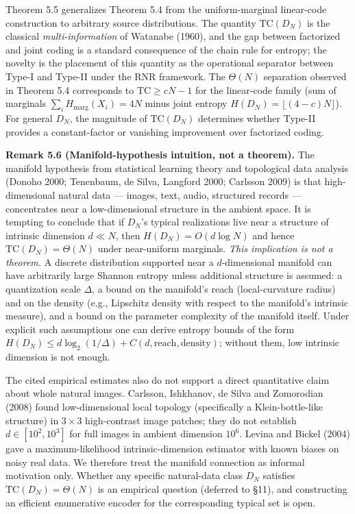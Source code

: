 \documentclass[
]{article}
\begin{document}
Theorem 5.5 generalizes Theorem 5.4 from the uniform-marginal
linear-code construction to arbitrary source distributions. The
quantity $\mathrm{TC}(D_N)$ is the classical \emph{multi-information}
of Watanabe (1960), and the gap between factorized and joint coding
is a standard consequence of the chain rule for entropy; the novelty
is the placement of this quantity as the operational separator
between Type-I and Type-II under the RNR framework. The $\Theta(N)$
separation observed in Theorem 5.4 corresponds to
$\mathrm{TC} \geq cN - 1$ for the linear-code family (sum of
marginals $\sum_i H_{\text{marg}}(X_i) = 4N$ minus joint entropy
$H(D_N) = \lfloor (4-c)N \rfloor$). For general
$D_N$, the magnitude of $\mathrm{TC}(D_N)$ determines whether Type-II
provides a constant-factor or vanishing improvement over factorized
coding.

\textbf{Remark 5.6 (Manifold-hypothesis intuition, not a theorem).}
The manifold hypothesis from statistical learning theory and
topological data analysis (Donoho 2000; Tenenbaum, de Silva, Langford
2000; Carlsson 2009) is that high-dimensional natural data ---
images, text, audio, structured records --- concentrates near a
low-dimensional structure in the ambient space. It is tempting to
conclude that if $D_N$'s typical realizations live near a structure
of intrinsic dimension $d \ll N$, then $H(D_N) = O(d \log N)$ and
hence $\mathrm{TC}(D_N) = \Theta(N)$ under near-uniform marginals.
\emph{This implication is not a theorem.} A discrete distribution
supported near a $d$-dimensional manifold can have arbitrarily large
Shannon entropy unless additional structure is assumed: a
quantization scale $\Delta$, a bound on the manifold's reach
(local-curvature radius) and on the density (e.g., Lipschitz density
with respect to the manifold's intrinsic measure), and a bound on
the parameter complexity of the manifold itself. Under explicit such
assumptions one can derive entropy bounds of the form
$H(D_N) \leq d \log_2(1/\Delta) + C(d, \mathrm{reach}, \text{density})$;
without them, low intrinsic dimension is not enough.

The cited empirical estimates also do not support a direct
quantitative claim about whole natural images. Carlsson, Ishkhanov,
de Silva and Zomorodian (2008) found low-dimensional local topology
(specifically a Klein-bottle-like structure) in $3 \times 3$
high-contrast image patches; they do not establish
$d \in [10^2, 10^3]$ for full images in ambient dimension $10^6$.
Levina and Bickel (2004) gave a maximum-likelihood intrinsic-dimension
estimator with known biases on noisy real data. We therefore treat
the manifold connection as informal motivation only. Whether any
specific natural-data class $D_N$ satisfies $\mathrm{TC}(D_N) =
\Theta(N)$ is an empirical question (deferred to §11), and
constructing an efficient enumerative encoder for the corresponding
typical set is open.
\end{document}
